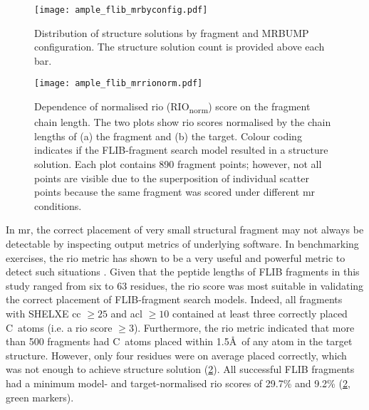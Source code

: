 \begin{figure}[H]
	\centering
	\texttt{[image: ample\_flib\_mrbyconfig.pdf]}
	\caption[MR structure solutions by input parameters]{Distribution of structure solutions by fragment and MRBUMP configuration. The structure solution count is provided above each bar.}
	\label{fig:ample_flib_mrbyconfig}
\end{figure}

\begin{figure}[H]
	\centering
	\texttt{[image: ample\_flib\_mrrionorm.pdf]}
	\caption[Relationship between fragment chain length and RIO scores]{Dependence of normalised \acrlong{rio} (RIO\textsubscript{norm}) score on the fragment chain length. The two plots show  \gls{rio} scores normalised by the chain lengths of (a) the fragment and (b) the target. Colour coding indicates if the FLIB-fragment search model resulted in a structure solution. Each plot contains 890 fragment points; however, not all points are visible due to the superposition of individual scatter points because the same fragment was scored under different \gls{mr} conditions.}
	\label{fig:ample_flib_mrrionorm}
\end{figure}

In \gls{mr}, the correct placement of very small structural fragment may not always be detectable by inspecting output metrics of underlying software. In benchmarking exercises, the \gls{rio} metric has shown to be a very useful and powerful metric to detect such situations \cite{Thomas2015-wu,Thomas2017-sh}. Given that the peptide lengths of FLIB fragments in this study ranged from six to 63 residues, the \gls{rio} score was most suitable in validating the correct placement of FLIB-fragment search models. Indeed, all fragments with SHELXE \gls{cc} $\geq25$ and \gls{acl} $\geq10$ contained at least three correctly placed C\textalpha\ atoms (i.e. a \gls{rio} score $\geq3$). Furthermore, the \gls{rio} metric indicated that more than 500 fragments had C\textalpha\ atoms placed within 1.5\AA\ of any atom in the target structure. However, only four residues were on average placed correctly, which was not enough to achieve structure solution (\cref{fig:ample_flib_mrrionorm}). All successful FLIB fragments had a minimum model- and target-normalised \gls{rio} scores of 29.7\% and 9.2\% (\cref{fig:ample_flib_mrrionorm}, green markers). 


